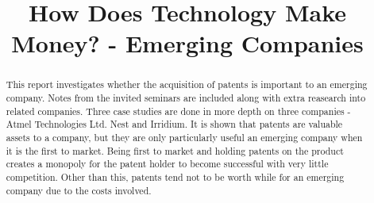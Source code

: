 \documentclass{elec6049Report}     %
\newcommand{\inote}[1] {\todo[inline]{#1}}
\begin{document}
\frontmatter
{}
\title      {How Does Technology Make Money? - Emerging Companies}

\maketitle
\listoftodos
{}
{}
\begin{abstract}
\inote{Complete Abstract}
This report investigates whether the acquisition of patents is important to an emerging company. 
Notes from the invited seminars are included along with extra reasearch into related companies.
Three case studies are done in more depth on three companies - Atmel Technologies Ltd. Nest and Irridium.
It is shown that patents are valuable assets to a company, but they are only particularly useful an emerging company when it is the first to market.
Being first to market and holding patents on the product creates a monopoly for the patent holder to become successful with very little competition.
Other than this, patents tend not to be worth while for an emerging company due to the costs involved.
\end{abstract}
\mainmatter





\backmatter


\appendix



 
\end{document}
